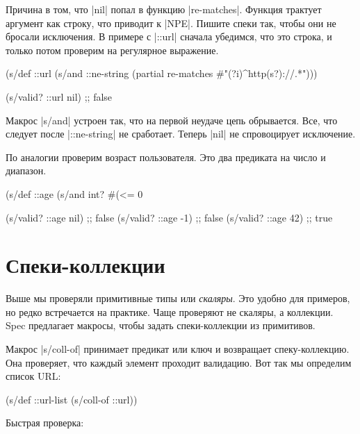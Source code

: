 Причина в том, что \spverb|nil| попал в функцию \spverb|re-matches|. Функция
трактует аргумент как строку, что приводит к \spverb|NPE|. Пишите спеки так,
чтобы они не бросали исключения. В примере с \spverb|::url| сначала убедимся,
что это строка, и только потом проверим на регулярное выражение.

\begin{english}
  \begin{clojure}
(s/def ::url
  (s/and ::ne-string
         (partial re-matches #"(?i)^http(s?)://.*")))

(s/valid? ::url nil) ;; false
  \end{clojure}
\end{english}

Макрос \spverb|s/and| устроен так, что на первой неудаче цепь обрывается. Все,
что следует после \spverb|::ne-string| не сработает. Теперь \spverb|nil| не
спровоцирует исключение.

По аналогии проверим возраст пользователя. Это два предиката на число и
диапазон.

\begin{english}
  \begin{clojure}
(s/def ::age
  (s/and int? #(<= 0 %

(s/valid? ::age nil) ;; false
(s/valid? ::age -1)  ;; false
(s/valid? ::age 42)  ;; true
  \end{clojure}
\end{english}

\section{Спеки-коллекции}

Выше мы проверяли примитивные типы или \emph{скаляры}. Это удобно для примеров,
но редко встречается на практике. Чаще проверяют не скаляры, а коллекции. Spec
предлагает макросы, чтобы задать спеки-коллекции из примитивов.

Макрос \spverb|s/coll-of| принимает предикат или ключ и возвращает
спеку-коллекцию. Она проверяет, что каждый элемент проходит валидацию. Вот так
мы определим список URL:

\begin{english}
  \begin{clojure}
(s/def ::url-list (s/coll-of ::url))
  \end{clojure}
\end{english}

\noindent
Быстрая проверка:

